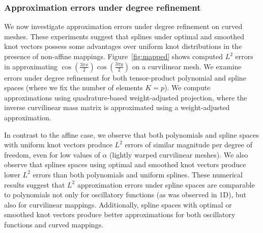 \documentclass[preprint,10pt]{elsarticle}
\newcommand{\LRp}[1]{\left( #1 \right)}
\newcommand{\reviewerOne}[1]{#1}
\begin{document}
\subsubsection{Approximation errors under degree refinement}

We now investigate approximation errors under degree refinement on curved meshes.  These experiments suggest that splines under optimal and smoothed knot vectors possess some advantages over uniform knot distributions in the presence of non-affine mappings.  Figure~\ref{fig:mapped} shows computed $L^2$ errors in approximating $\cos\LRp{\frac{3\pi x}{2}}\cos\LRp{\frac{3\pi y}{2}}$ on a curvilinear mesh.  We examine errors under degree refinement for both tensor-product polynomial and spline spaces (where we fix the number of  elements $K=p$).  \reviewerOne{We compute approximations using quadrature-based weight-adjusted projection, where the inverse curvilinear mass matrix is approximated using a weight-adjusted approximation.}  

In contrast to the affine case, we observe that both polynomials and spline spaces with uniform knot vectors produce $L^2$ errors of similar magnitude per degree of freedom, even for low values of $\alpha$ (lightly warped curvilinear meshes).  We also observe that splines spaces using optimal and smoothed knot vectors produce lower $L^2$ errors than both polynomials and uniform splines.  These numerical results suggest that $L^2$ approximation errors under spline spaces are comparable to polynomials not only for oscillatory functions (as was observed in 1D), but also for curvilinear mappings.  Additionally, spline spaces with optimal or smoothed knot vectors produce better approximations for both oscillatory functions and curved mappings.  
\end{document}

